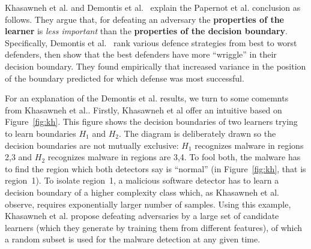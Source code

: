 \documentclass{NSF}
\newcommand{\fig}[1]{Figure~\ref{fig:#1}}
\begin{document}
\begin{nsfdescription}
\noindent Khasawneh et al.\cite{khasawneh2017rhmd} and Demontis et al.~\cite{demontis2019adversarial} explain the Papernot et al. conclusion as follows.
  They argue that, for defeating an adversary
  the {\bf properties of the learner} is {\em less important} than 
  the {\bf properties of the decision boundary}.
  Specifically,
  Demontis et al.~\cite{demontis2019adversarial}
  rank various defence strategies from best to worst defenders, then show  
  that the best defenders have  more ``wriggle'' in their decision boundary. They found
  empirically that increased   variance in the position of the boundary predicted for which defense was most successful.
 
    
 For an explanation
of the   Demontis et al. results, we turn 
to some  comemnts from
Khasawneh et al.\cite{khasawneh2017rhmd}.
Firstly, Khasawneh et al
offer  an    intuitive based  on \fig{kh}.
This figure shows the decision boundaries of two  learners trying to learn boundaries
   $H_1$ and $H_2$. The diagram is deliberately drawn so the     decision boundaries are not mutually exclusive: $H_1$ recognizes  malware in regions   2,3 and $H_2$
  recognizes malware in regions are 3,4. To fool both, the malware has to find the region which both detectors say is ``normal'' (in \fig{kh}, that is region~1).
To isolate region~1,
  a   malicious software  detector has     to learn a decision boundary of a higher complexity class  which, as  Khasawneh et al. observe,  requires exponentially larger number of samples.
Using this example, Khasawneh et al. propose defeating adversaries by  a large set of candidate learners (which they generate by training them from different features),  of which a random subset is used for the malware detection at any given time.  


\end{nsfdescription}
\end{document}

